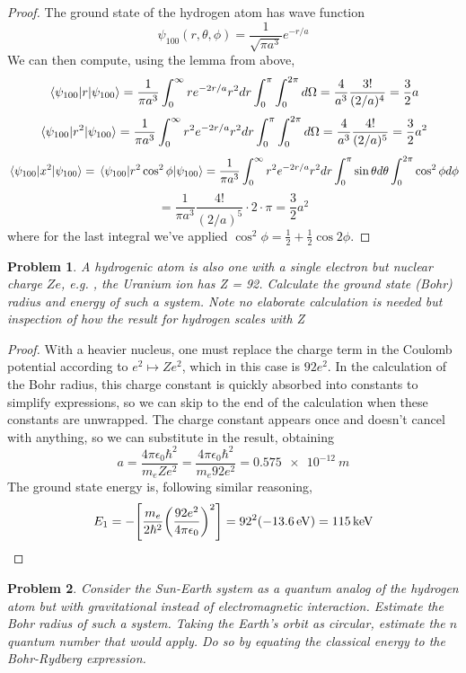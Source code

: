 \documentclass{article}
\newtheorem{prob}{Problem}
\begin{document}
\begin{proof}
  The ground state of the hydrogen atom has wave function
  \[
    \psi_{100}(r,\theta,\phi) = \frac{1}{\sqrt{\pi a^{3}}}e^{-r / a}
  \]
  We can then compute, using the lemma from above,
  \[
    \expval{r}{\psi_{100}} = \frac{1}{\pi a^{3}}\int_{0}^{\infty}re^{-2r/a}r^{2}dr\int_{0}^{\pi}\int_{0}^{2\pi}d\Omega = \frac{4}{a^{3}}\frac{3!}{(2 / a)^{4}}
    = \frac{3}{2}a
  \]
  \[
    \expval{r^{2}}{\psi_{100}} = \frac{1}{\pi a^{3}}\int_{0}^{\infty}r^{2}e^{-2r/a}r^{2}dr\int_{0}^{\pi}\int_{0}^{2\pi}d\Omega
    =\frac{4}{a^{3}}\frac{4!}{(2/a)^{5}} = \frac{3}{2}a^{2}
  \]
  \[
    \expval{x^{2}}{\psi_{100}} = \expval{r^{2}\cos^{2}\phi}{\psi_{100}} =\frac{1}{\pi a^{3}}\int_{0}^{\infty}r^{2}e^{-2r/a}r^{2}dr\int_{0}^{\pi}\sin\theta d\theta
    \int_{0}^{2\pi}\cos^{2}\phi d\phi
  \]
  \[
    = \frac{1}{\pi a^{3}}\frac{4!}{(2/a)^{5}}\cdot 2\cdot \pi = \frac{3}{2}a^{2}
  \]
  where for the last integral we've applied $\cos^{2}\phi = \frac{1}{2} + \frac{1}{2}\cos2\phi$.
\end{proof}

\begin{prob}
  A hydrogenic atom is also one with a single electron but nuclear charge $Ze$, e.g. , the Uranium ion has Z = 92.
  Calculate the ground state (Bohr) radius and energy of such a system.
  Note no elaborate calculation is needed but inspection of how the result for hydrogen scales with Z
\end{prob}

\begin{proof}
  With a heavier nucleus, one must replace the charge term in the Coulomb potential according to $e^{2}\mapsto Ze^{2}$, which in this case is $92e^{2}$.
  In the calculation of the Bohr radius, this charge constant is quickly absorbed into constants to simplify expressions,
  so we can skip to the end of the calculation when these constants are unwrapped.
  The charge constant appears once and doesn't cancel with anything, so we can substitute in the result, obtaining
  \[
    a = \frac{4\pi\epsilon_{0}\hbar^{2}}{m_{e}Ze^{2}} = \frac{4\pi\epsilon_{0}\hbar^{2}}{m_{e}92e^{2}} = \SI{0.575e-12}{m}
  \]
  The ground state energy is, following similar reasoning,
  \[
    E_{1} = -\qty[\frac{m_{e}}{2\hbar^{2}}\qty(\frac{92e^{2}}{4\pi\epsilon_{0}})^{2}] = 92^{2}(-\SI{13.6}{eV}) = \SI{115}{keV}
  \]
\end{proof}

\begin{prob}
  Consider the Sun-Earth system as a quantum analog of the hydrogen atom but with gravitational instead of electromagnetic interaction.
  Estimate the Bohr radius of such a system.
  Taking the Earth’s orbit as circular, estimate the $n$ quantum number that would apply.
  Do so by equating the classical energy to the Bohr-Rydberg expression.
\end{prob}
\end{document}
